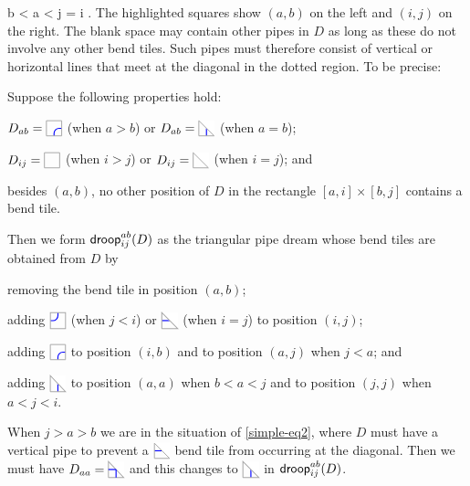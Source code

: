 \documentclass[10pt]{article}
\begin{document}
\sdgap
 b < a < j = i
\earr.
\ee
The highlighted squares show $(a,b)$ on the left and $(i,j)$ on the right. 
The blank space may contain other pipes in $D$ 
as long as these do not involve any other bend tiles. 
Such pipes must therefore consist of vertical or horizontal lines that meet at the diagonal in the dotted region.
To be precise:

\begin{definition}
\label{droop-def}
Suppose the following properties hold:
\ben
\item[(1)] $D_{ab} = \CTILE$ (when $a>b$) or $D_{ab} =\CDIAG$ (when $a=b$);

\item[(2)] $D_{ij} = \BTILE$ (when $i>j$) or $D_{ij}=\BDIAG$ (when $i=j$); and

\item[(3)] besides $(a,b)$, 
no other position of $D$ in the rectangle $[a,i]\times[b,j]$
contains a bend tile. 

\een
Then we form $\mathsf{droop}^{ab}_{ij}(D)$ as the triangular pipe dream
whose bend tiles are obtained from    $D$ by   
\bei
\item[(a)] removing the bend tile in position $(a,b)$;

\item[(b)] adding $\JTILE$ (when $j<i$) or $\JDIAG$ (when $i=j$) to position $(i,j)$;

\item[(c)] adding $\CTILE$ to position $(i,b)$ and to position $(a,j)$ when $j<a$; and

\item[(d)] adding $\CDIAG$ to position $(a,a)$ when $b<a<j$ and  to position $(j,j)$ when $a<j<i$.

\eei
\end{definition}

When $j>a>b$ we are in the situation
of \eqref{simple-eq2}, where $D$ must have a vertical pipe
to prevent a $\JDIAG$ bend tile from occurring at the diagonal.
Then we must have $D_{aa} = \PDIAG$ and this changes to $\CDIAG$ in $\mathsf{droop}^{ab}_{ij}(D)$.
\end{document}
